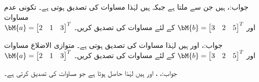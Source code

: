 جواب:،  ہیں جن سے  ملتا ہے جبکہ   ہیں لہٰذا مساوات  کی تصدیق ہوتی ہے۔
\quad تکونی عدم مساوات\\
\begin{math}
\bM{a}=\begin{bmatrix}2&1&3\end{bmatrix}^T
\end{math}
اور
\begin{math}
\bM{b}=\begin{bmatrix}3&2&5\end{bmatrix}^T
\end{math}
کے لئے مساوات  کی تصدیق کریں۔

جواب:،  اور  ہیں لہٰذا مساوات  کی تصدیق ہوتی ہے۔
\quad متوازی الاضلاع مساوات\\
\begin{math}
\bM{a}=\begin{bmatrix}2&1&3\end{bmatrix}^T
\end{math}
اور
\begin{math}
\bM{b}=\begin{bmatrix}3&2&5\end{bmatrix}^T
\end{math}
کے لئے مساوات  کی تصدیق کریں۔

جواب:، ،    اور
  ہیں لہٰذا  حاصل ہوتا ہے جو  مساوات  کی تصدیق کرتی ہے۔

